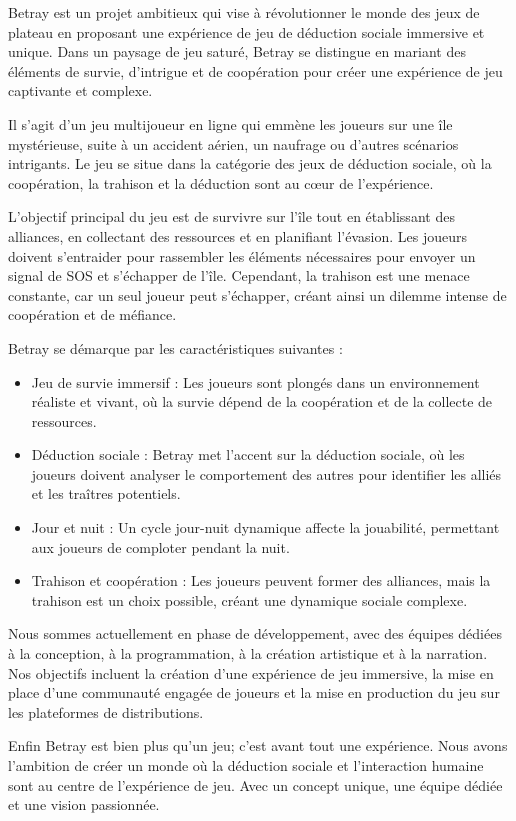 \documentclass[
	article,			%
	11pt,				%
	oneside,			%
	a4paper,			%
	chapter=TITLE,
	french,			%
	sumario=tradicional
	]{base_nt}
\begin{document}
Betray est un projet ambitieux qui vise à révolutionner le monde des jeux de plateau en proposant une expérience de jeu de déduction sociale immersive et unique. Dans un paysage de jeu saturé, Betray se distingue en mariant des éléments de survie, d'intrigue et de coopération pour créer une expérience de jeu captivante et complexe.

Il s'agit d'un jeu multijoueur en ligne qui emmène les joueurs sur une île mystérieuse, suite à un accident aérien, un naufrage ou d'autres scénarios intrigants. Le jeu se situe dans la catégorie des jeux de déduction sociale, où la coopération, la trahison et la déduction sont au cœur de l'expérience.

L'objectif principal du jeu est de survivre sur l'île tout en établissant des alliances, en collectant des ressources et en planifiant l'évasion. Les joueurs doivent s'entraider pour rassembler les éléments nécessaires pour envoyer un signal de SOS et s'échapper de l'île. Cependant, la trahison est une menace constante, car un seul joueur peut s'échapper, créant ainsi un dilemme intense de coopération et de méfiance.

Betray se démarque par les caractéristiques suivantes :
\begin{itemize}
    \item Jeu de survie immersif : Les joueurs sont plongés dans un environnement réaliste et vivant, où la survie dépend de la coopération et de la collecte de ressources.
    \item Déduction sociale : Betray met l'accent sur la déduction sociale, où les joueurs doivent analyser le comportement des autres pour identifier les alliés et les traîtres potentiels.
    \item Jour et nuit : Un cycle jour-nuit dynamique affecte la jouabilité, permettant aux joueurs de comploter pendant la nuit.
    \item Trahison et coopération : Les joueurs peuvent former des alliances, mais la trahison est un choix possible, créant une dynamique sociale complexe.
\end{itemize}

Nous sommes actuellement en phase de développement, avec des équipes dédiées à la conception, à la programmation, à la création artistique et à la narration. Nos objectifs incluent la création d'une expérience de jeu immersive, la mise en place d'une communauté engagée de joueurs et la mise en production du jeu sur les plateformes de distributions.

Enfin Betray est bien plus qu'un jeu; c'est avant tout une expérience. Nous avons l'ambition de créer un monde où la déduction sociale et l'interaction humaine sont au centre de l'expérience de jeu. Avec un concept unique, une équipe dédiée et une vision passionnée.
\end{document}
